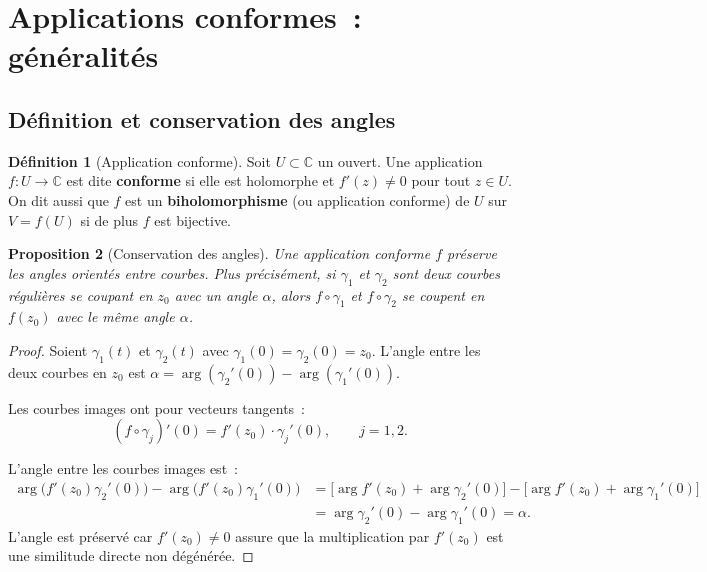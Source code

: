 \documentclass[12pt,a4paper,openany]{book}
\theoremstyle{definition}
\newtheorem{definition}{Définition}[chapter]
\theoremstyle{plain}
\newtheorem{proposition}[definition]{Proposition}
\theoremstyle{remark}
\newcommand{\C}{\mathbb{C}}
\begin{document}
\section{Applications conformes~: généralités}\label{sec:conforme-gen}

\subsection{Définition et conservation des angles}

\begin{definition}[Application conforme]\label{def:conforme}
Soit $U \subset \C$ un ouvert. Une application $f \colon U \to \C$
est dite \textbf{conforme} si elle est holomorphe et $f'(z) \neq 0$ pour tout
$z \in U$. On dit aussi que $f$ est un \textbf{biholomorphisme} (ou application
conforme) de $U$ sur $V = f(U)$ si de plus $f$ est bijective.
\end{definition}

\begin{proposition}[Conservation des angles]\label{prop:conservation-angles}
Une application conforme $f$ préserve les angles orientés entre courbes.
Plus précisément, si $\gamma_1$ et $\gamma_2$ sont deux courbes régulières
se coupant en $z_0$ avec un angle $\alpha$, alors $f \circ \gamma_1$ et
$f \circ \gamma_2$ se coupent en $f(z_0)$ avec le même angle $\alpha$.
\end{proposition}

\begin{proof}
Soient $\gamma_1(t)$ et $\gamma_2(t)$ avec $\gamma_1(0) = \gamma_2(0) = z_0$.
L'angle entre les deux courbes en $z_0$ est
$\alpha = \arg(\gamma_2'(0)) - \arg(\gamma_1'(0))$.

Les courbes images ont pour vecteurs tangents~:
\[
  (f \circ \gamma_j)'(0) = f'(z_0) \cdot \gamma_j'(0), \qquad j = 1, 2.
\]

L'angle entre les courbes images est~:
\begin{align*}
  \arg\bigl(f'(z_0)\gamma_2'(0)\bigr) - \arg\bigl(f'(z_0)\gamma_1'(0)\bigr)
  &= \bigl[\arg f'(z_0) + \arg\gamma_2'(0)\bigr]
    - \bigl[\arg f'(z_0) + \arg\gamma_1'(0)\bigr] \\
  &= \arg\gamma_2'(0) - \arg\gamma_1'(0) = \alpha.
\end{align*}
L'angle est préservé car $f'(z_0) \neq 0$ assure que la multiplication par
$f'(z_0)$ est une similitude directe non dégénérée.
\end{proof}
\end{document}
